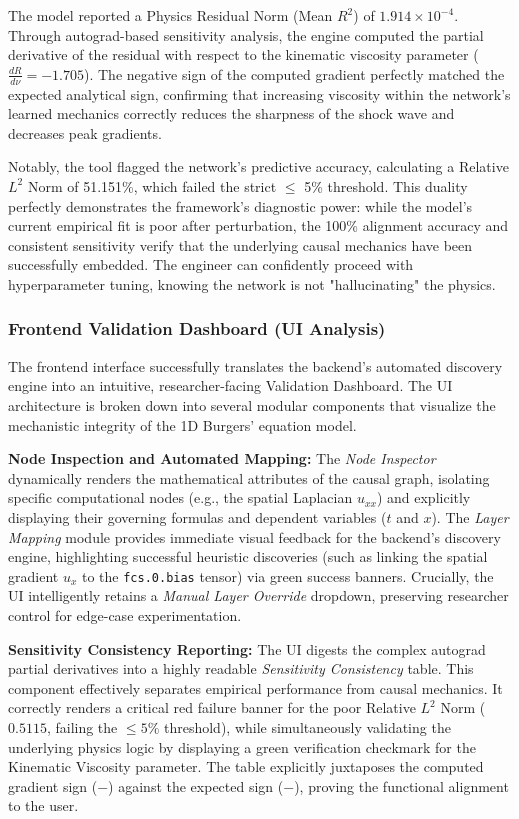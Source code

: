 \documentclass[12pt,singleside,a4paper]{article}
\begin{document}
The model reported a Physics Residual Norm (Mean $R^2$) of $1.914 \times 10^{-4}$. Through autograd-based sensitivity analysis, the engine computed the partial derivative of the residual with respect to the kinematic viscosity parameter ($\frac{dR}{d\nu} = -1.705$). The negative sign of the computed gradient perfectly matched the expected analytical sign, confirming that increasing viscosity within the network's learned mechanics correctly reduces the sharpness of the shock wave and decreases peak gradients.

Notably, the tool flagged the network's predictive accuracy, calculating a Relative $L^2$ Norm of 51.151\%, which failed the strict $\le$ 5\% threshold. This duality perfectly demonstrates the framework's diagnostic power: while the model's current empirical fit is poor after perturbation, the 100\% alignment accuracy and consistent sensitivity verify that the underlying causal mechanics have been successfully embedded. The engineer can confidently proceed with hyperparameter tuning, knowing the network is not "hallucinating" the physics.

\subsubsection{Frontend Validation Dashboard (UI Analysis)}
The frontend interface successfully translates the backend's automated discovery engine into an intuitive, researcher-facing Validation Dashboard. The UI architecture is broken down into several modular components that visualize the mechanistic integrity of the 1D Burgers' equation model.

\textbf{Node Inspection and Automated Mapping:}
The \textit{Node Inspector} dynamically renders the mathematical attributes of the causal graph, isolating specific computational nodes (e.g., the spatial Laplacian $u_{xx}$) and explicitly displaying their governing formulas and dependent variables ($t$ and $x$). The \textit{Layer Mapping} module provides immediate visual feedback for the backend's discovery engine, highlighting successful heuristic discoveries (such as linking the spatial gradient $u_x$ to the \texttt{fcs.0.bias} tensor) via green success banners. Crucially, the UI intelligently retains a \textit{Manual Layer Override} dropdown, preserving researcher control for edge-case experimentation.

\textbf{Sensitivity Consistency Reporting:}
The UI digests the complex autograd partial derivatives into a highly readable \textit{Sensitivity Consistency} table. This component effectively separates empirical performance from causal mechanics. It correctly renders a critical red failure banner for the poor Relative $L^2$ Norm ($0.5115$, failing the $\le 5\%$ threshold), while simultaneously validating the underlying physics logic by displaying a green verification checkmark for the Kinematic Viscosity parameter. The table explicitly juxtaposes the computed gradient sign ($-$) against the expected sign ($-$), proving the functional alignment to the user.
\end{document}
